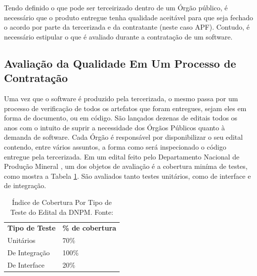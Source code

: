 Tendo definido o que pode ser terceirizado dentro de um Órgão público, é necessário que o produto entregue tenha qualidade aceitável para que seja fechado o acordo por parte da tercerizada e da contratante (neste caso APF). Contudo, é necessário estipular o que é avaliado durante a contratação de um software.

\subsection{Avaliação da Qualidade Em Um Processo de Contratação }
Uma vez que o software é produzido pela tercerizada, o mesmo passa por um processo de verificação de todos os artefatos que foram entregues, sejam eles em forma de documento, ou em código. São lançados dezenas de editais todos os anos com o intuito de suprir a necessidade dos Órgãos Públicos quanto à demanda de software. Cada Órgão é responsável por disponibilizar o seu edital contendo, entre vários assuntos, a forma como será inspecionado o código entregue pela tercerizada. Em um edital feito pelo Departamento Nacional de Produção Mineral \cite{edital}, um dos objetos de avaliação é a cobertura miníma de testes, como mostra a Tabela \ref{tabela1}. São avaliados tanto testes unitários, como de interface e de integração.

\begin{table}[h]
\centering
\caption{Índice de Cobertura Por Tipo de Teste do Edital da DNPM. Fonte:\cite{edital}}
\label{tabela1}
\begin{tabular}{ll}
\textbf{Tipo de Teste} & \textbf{\% de cobertura} \\
Unitários              & 70\%                     \\
De Integração          & 100\%                    \\
De Interface           & 20\%                    
\end{tabular}
\end{table}



